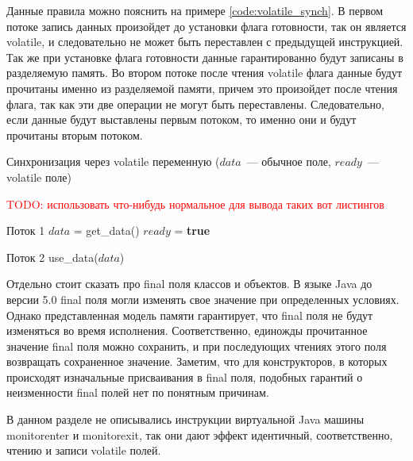 \documentclass[14pt,titlepage]{extarticle}
\newcommand{\BOOLTRUE}{\textbf{true }}
\newcommand{\todo}[1]{\textcolor{red}{TODO: #1}}
\newcommand{\eng}[1]{{\English#1}}
\begin{document}
      Данные правила можно пояснить на примере \ref{code:volatile_synch}.
      В первом потоке запись данных произойдет до установки флага готовности,
      так он является \eng{volatile}, и следовательно не может быть переставлен
      с предыдущей инструкцией. Так же при установке флага готовности данные
      гарантированно будут записаны в разделяемую память.
      Во втором потоке после чтения \eng{volatile} флага данные будут прочитаны
      именно из разделяемой памяти, причем это произойдет после чтения флага,
      так как эти две операции не могут быть переставлены.
      Следовательно, если данные будут выставлены первым потоком, то именно
      они и будут прочитаны вторым потоком.
      \begin{algorithm}
        \caption{Синхронизация через \eng{volatile} переменную
          ($data$~--- обычное поле, $ready$~--- \eng{volatile} поле)}
        \label{code:volatile_synch}
        \todo{использовать что-нибудь нормальное для вывода таких вот
              листингов}
        \begin{algorithmic}[1]
          \REQUIRE Поток 1
          \STATE $data$ = get\_data()
          \STATE $ready$ = \BOOLTRUE
        \end{algorithmic}
        \begin{algorithmic}[1]
          \REQUIRE Поток 2
          \STATE {}
          \ENDWHILE
          \STATE use\_data($data$)
        \end{algorithmic}
      \end{algorithm}

      Отдельно стоит сказать про \eng{final} поля классов и объектов.
      В языке Java до версии 5.0 \eng{final} поля могли изменять свое значение
      при определенных условиях. Однако представленная модель памяти
      гарантирует, что \eng{final} поля не будут изменяться во время
      исполнения. Соответственно, единожды прочитанное значение \eng{final}
      поля можно сохранить, и при последующих чтениях этого поля возвращать
      сохраненное значение.
      Заметим, что для конструкторов, в которых происходят изначальные
      присваивания в \eng{final} поля, подобных гарантий о неизменности
      \eng{final} полей нет по понятным причинам.

      В данном разделе не описывались инструкции виртуальной Java машины
      monitorenter и monitorexit, так они дают эффект идентичный,
      соответственно, чтению и записи \eng{volatile} полей.
\end{document}
